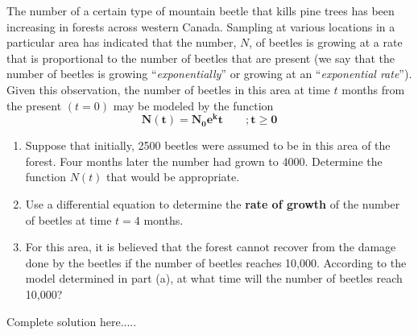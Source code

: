 \begin{example}
The number of a certain type of mountain beetle that kills pine trees has been increasing in forests across western Canada.  Sampling at various locations in a particular area has indicated that the number, $N$, of beetles is growing at a rate that is proportional to the number of beetles that are present (we say that the number of beetles is growing “\emph{exponentially}” or growing at an “\emph{exponential rate}”).  Given this observation, the number of beetles in this area at time $t$ months from the present $(t=0)$ may be modeled by the function
$$\bm{N(t)=N_0 e^kt}\qquad \bm{;t\ge 0}$$
\renewcommand{\labelenumi}{\textbf{(\alph{enumi})}}
\begin{enumerate}[leftmargin=*]
    \item Suppose that initially, 2500 beetles were assumed to be in this area of the forest.  Four months later the number had grown to 4000.  Determine the function $N(t)$ that would be appropriate.  	
    \item Use a differential equation to determine the \textbf{rate of growth} of the number of beetles at time $t=4$ months.     \newpage
    \item For this area, it is believed that the forest cannot recover from the damage done by the beetles if the number of beetles reaches 10,000.  According to the model determined in part (a), at what time will the number of beetles reach 10,000?
\end{enumerate}
    \begin{sol}
    \end{sol}
    \begin{solL}
    Complete solution here.....
    
    \end{solL}
    
\end{example}
\vspace{1.5 in} 

